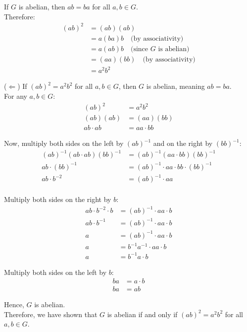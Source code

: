 \documentclass{article}
\begin{document}
If $G$ is abelian, then $ab = ba$ for all $a,b \in G$. \\

Therefore:
\begin{align*}
(ab)^2 &= (ab)(ab) \\
&= a(ba)b \quad \text{(by associativity)} \\
&= a(ab)b \quad \text{(since $G$ is abelian)} \\
&= (aa)(bb) \quad \text{(by associativity)} \\
&= a^2b^2
\end{align*}

($\Leftarrow$) If $(ab)^2 = a^2b^2$ for all $a,b \in G$, then $G$ is abelian, meaning $ab = ba$. \\

For any $a,b \in G$:
\begin{align*}
(ab)^2 &= a^2b^2 \\
(ab)(ab) &= (aa)(bb) \\
ab \cdot ab &= aa \cdot bb
\end{align*}

Now, multiply both sides on the left by $(ab)^{-1}$ and on the right by $(bb)^{-1}$:
\begin{align*}
(ab)^{-1}(ab \cdot ab)(bb)^{-1} &= (ab)^{-1}(aa \cdot bb)(bb)^{-1} \\
ab \cdot (bb)^{-1} &= (ab)^{-1} \cdot aa \cdot bb \cdot (bb)^{-1} \\
ab \cdot b^{-2} &= (ab)^{-1} \cdot aa \\
\end{align*}

Multiply both sides on the right by $b$:
\begin{align*}
ab \cdot b^{-2} \cdot b &= (ab)^{-1} \cdot aa \cdot b \\
ab \cdot b^{-1} &= (ab)^{-1} \cdot aa \cdot b \\
a &= (ab)^{-1} \cdot aa \cdot b \\
a &= b^{-1}a^{-1} \cdot aa \cdot b \\
a &= b^{-1}a \cdot b
\end{align*}

Multiply both sides on the left by $b$:
\begin{align*}
ba &= a \cdot b \\
ba &= ab
\end{align*}

Hence, $G$ is abelian. \\

Therefore, we have shown that $G$ is abelian if and only if $(ab)^2 = a^2b^2$ for all $a,b \in G$.
\end{document}
